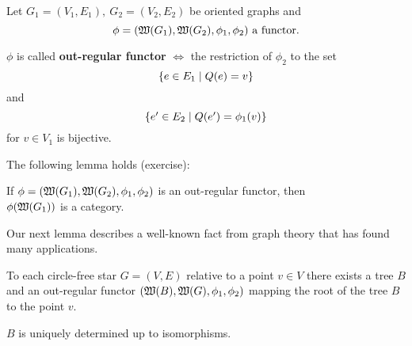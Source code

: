 \bigskip
\begin{definition}
Let $G_1=(V_1,E_1),\ G_2=(V_2,E_2)$ be oriented graphs and
\[ \phi = (\mbox{$\mathfrak{W}({G_1})$}, \mbox{$\mathfrak{W}({G_2})$}, \phi_1, \phi_2)\text{ a functor.}
\]

$\phi$ is called {\bf out-regular functor} $\iff$ the restriction of $\phi_2$
to the set \[ \mbox{$\{e\in E_1 \mid Q(e) = v\}$} \] and \[ \mbox{$\{e' \in E_2 \mid
Q(e') = \phi_1(v)\}$} \] for $v \in V_1$ is bijective.
\end{definition}

The following lemma holds (exercise):

\begin{lemma}
If $\phi = (\mbox{$\mathfrak{W}({G_1})$}, \mbox{$\mathfrak{W}({G_2})$}, \phi_1, \phi_2)$ is an out-regular
functor, then \\ $\phi(\mbox{$\mathfrak{W}({G_1})$})$ is a category.
\end{lemma}

Our next lemma describes a well-known fact from graph theory that has found many
applications.

\begin{lemma}
To each circle-free star $G = (V, E)$ relative to a point $v \in V$ there exists
a tree $B$ and an out-regular functor $(\mbox{$\mathfrak{W}({B})$}, \mbox{$\mathfrak{W}({G})$},
\phi_1, \phi_2)$ mapping the root of the tree $B$ to the point $v$. 
\end{lemma}

$B$ is uniquely determined up to isomorphisms.
